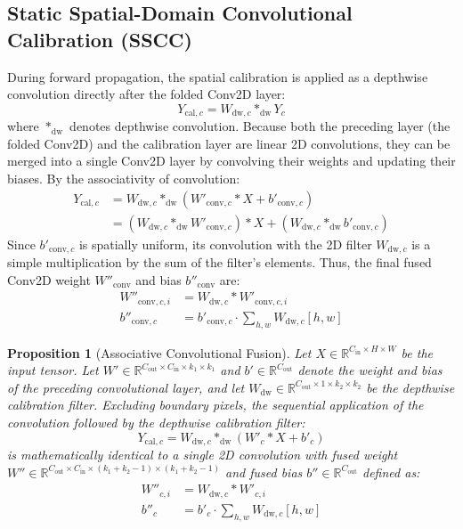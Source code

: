 \documentclass{article}
\theoremstyle{plain}
\newtheorem{proposition}[theorem]{Proposition}
\theoremstyle{definition}
\theoremstyle{remark}
\begin{document}
\subsection{Static Spatial-Domain Convolutional Calibration (SSCC)}
During forward propagation, the spatial calibration is applied as a depthwise convolution directly after the folded Conv2D layer:
\begin{equation}
    Y_{\text{cal}, c} = W_{\text{dw}, c} *_{\text{dw}} Y_c
\end{equation}
where $*_{\text{dw}}$ denotes depthwise convolution. Because both the preceding layer (the folded Conv2D) and the calibration layer are linear 2D convolutions, they can be merged into a single Conv2D layer by convolving their weights and updating their biases. By the associativity of convolution:
\begin{align}
    Y_{\text{cal}, c} &= W_{\text{dw}, c} *_{\text{dw}} (W'_{\text{conv}, c} * X + b'_{\text{conv}, c}) \\
    &= (W_{\text{dw}, c} *_{\text{dw}} W'_{\text{conv}, c}) * X + (W_{\text{dw}, c} *_{\text{dw}} b'_{\text{conv}, c})
\end{align}
Since $b'_{\text{conv}, c}$ is spatially uniform, its convolution with the 2D filter $W_{\text{dw}, c}$ is a simple multiplication by the sum of the filter's elements. Thus, the final fused Conv2D weight $W''_{\text{conv}}$ and bias $b''_{\text{conv}}$ are:
\begin{align}
    W''_{\text{conv}, c, i} &= W_{\text{dw}, c} * W'_{\text{conv}, c, i} \\
    b''_{\text{conv}, c} &= b'_{\text{conv}, c} \cdot \sum_{h, w} W_{\text{dw}, c}[h, w]
\end{align}

\begin{proposition}[Associative Convolutional Fusion]
Let $X \in \mathbb{R}^{C_{\text{in}} \times H \times W}$ be the input tensor. Let $W' \in \mathbb{R}^{C_{\text{out}} \times C_{\text{in}} \times k_1 \times k_1}$ and $b' \in \mathbb{R}^{C_{\text{out}}}$ denote the weight and bias of the preceding convolutional layer, and let $W_{\text{dw}} \in \mathbb{R}^{C_{\text{out}} \times 1 \times k_2 \times k_2}$ be the depthwise calibration filter. Excluding boundary pixels, the sequential application of the convolution followed by the depthwise calibration filter:
\begin{equation}
    Y_{\text{cal}, c} = W_{\text{dw}, c} *_{\text{dw}} (W'_c * X + b'_c)
\end{equation}
is mathematically identical to a single 2D convolution with fused weight $W'' \in \mathbb{R}^{C_{\text{out}} \times C_{\text{in}} \times (k_1+k_2-1) \times (k_1+k_2-1)}$ and fused bias $b'' \in \mathbb{R}^{C_{\text{out}}}$ defined as:
\begin{align}
    W''_{c, i} &= W_{\text{dw}, c} * W'_{c, i} \\
    b''_c &= b'_c \cdot \sum_{h, w} W_{\text{dw}, c}[h, w]
\end{align}
\end{proposition}
\end{document}
